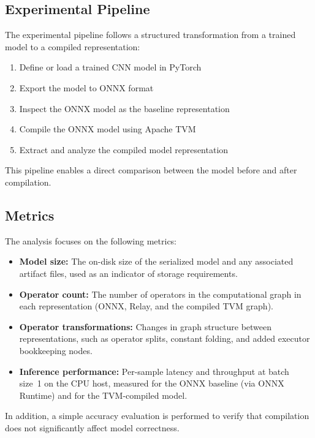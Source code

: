 \documentclass[fleqn,10pt]{olplainarticle}
\begin{document}
\subsection{Experimental Pipeline}

The experimental pipeline follows a structured transformation from a trained model to a compiled representation:

\begin{enumerate}
    \item Define or load a trained CNN model in PyTorch
    \item Export the model to ONNX format
    \item Inspect the ONNX model as the baseline representation
    \item Compile the ONNX model using Apache TVM
    \item Extract and analyze the compiled model representation
\end{enumerate}

This pipeline enables a direct comparison between the model before and after compilation.

\subsection{Metrics}

The analysis focuses on the following metrics:

\begin{itemize}
    \item \textbf{Model size:} The on-disk size of the serialized model and any associated artifact files, used as an indicator of storage requirements.
    \item \textbf{Operator count:} The number of operators in the computational graph in each representation (ONNX, Relay, and the compiled TVM graph).
    \item \textbf{Operator transformations:} Changes in graph structure between representations, such as operator splits, constant folding, and added executor bookkeeping nodes.
    \item \textbf{Inference performance:} Per-sample latency and throughput at batch size~1 on the CPU host, measured for the ONNX baseline (via ONNX Runtime) and for the TVM-compiled model.
\end{itemize}

In addition, a simple accuracy evaluation is performed to verify that compilation does not significantly affect model correctness.
\end{document}
